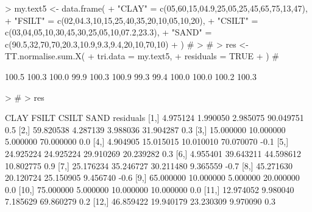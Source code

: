 \documentclass[a4paper]{article}
\begin{document}
\begin{Schunk}
\begin{Sinput}
> my.text5 <- data.frame(
+     "CLAY"  = c(05,60,15,04.9,25,05,25,45,65,75,13,47),
+     "FSILT" = c(02,04.3,10,15,25,40,35,20,10,05,10,20),
+     "CSILT" = c(03,04,05,10,30,45,30,25,05,10,07.2,23.3),
+     "SAND"  = c(90.5,32,70,70,20.3,10.9,9.3,9.4,20,10,70,10)
+ )   #
> #
> res <- TT.normalise.sum.X( 
+     tri.data    = my.text5,
+     residuals   = TRUE
+ )   #
\end{Sinput}
\begin{Soutput}
 [1] 100.5 100.3 100.0  99.9 100.3 100.9  99.3  99.4 100.0 100.0 100.2 100.3
\end{Soutput}
\begin{Sinput}
> #
> res
\end{Sinput}
\begin{Soutput}
           CLAY     FSILT     CSILT      SAND residuals
 [1,]  4.975124  1.990050  2.985075 90.049751       0.5
 [2,] 59.820538  4.287139  3.988036 31.904287       0.3
 [3,] 15.000000 10.000000  5.000000 70.000000       0.0
 [4,]  4.904905 15.015015 10.010010 70.070070      -0.1
 [5,] 24.925224 24.925224 29.910269 20.239282       0.3
 [6,]  4.955401 39.643211 44.598612 10.802775       0.9
 [7,] 25.176234 35.246727 30.211480  9.365559      -0.7
 [8,] 45.271630 20.120724 25.150905  9.456740      -0.6
 [9,] 65.000000 10.000000  5.000000 20.000000       0.0
[10,] 75.000000  5.000000 10.000000 10.000000       0.0
[11,] 12.974052  9.980040  7.185629 69.860279       0.2
[12,] 46.859422 19.940179 23.230309  9.970090       0.3
\end{Soutput}
\end{Schunk}
\end{document}
